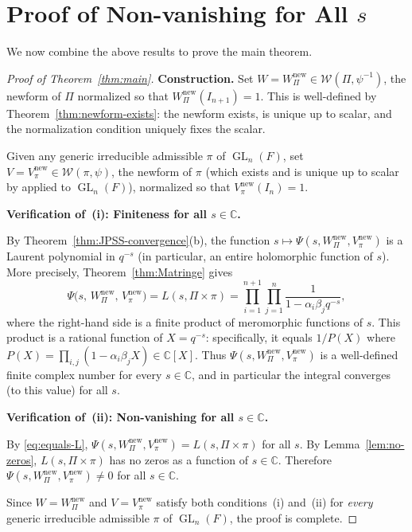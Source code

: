 \documentclass[12pt]{article}
\theoremstyle{definition}
\DeclareMathOperator{\GL}{GL}
\begin{document}
\section{Proof of Non-vanishing for All $s$}
\label{sec:nonvanishing}

We now combine the above results to prove the main theorem.

\begin{proof}[Proof of Theorem~\ref{thm:main}]

\textbf{Construction.}  Set $W = W_\Pi^{\mathrm{new}} \in \mathcal{W}(\Pi,\psi^{-1})$,
the newform of $\Pi$ normalized so that $W_\Pi^{\mathrm{new}}(I_{n+1}) = 1$.
This is well-defined by Theorem~\ref{thm:newform-exists}: the newform exists,
is unique up to scalar, and the normalization condition uniquely fixes the scalar.

Given any generic irreducible admissible $\pi$ of $\GL_n(F)$, set $V =
V_\pi^{\mathrm{new}} \in \mathcal{W}(\pi,\psi)$, the newform of $\pi$ (which
exists and is unique up to scalar by \cite[Theorems~(1),(2)]{JPSS81} applied to
$\GL_n(F)$), normalized so that $V_\pi^{\mathrm{new}}(I_n) = 1$.

\medskip
\textbf{Verification of~(i): Finiteness for all $s \in \mathbb{C}$.}

By Theorem~\ref{thm:JPSS-convergence}(b), the function
$s \mapsto \Psi(s, W_\Pi^{\mathrm{new}}, V_\pi^{\mathrm{new}})$ is a Laurent
polynomial in $q^{-s}$ (in particular, an entire holomorphic function of $s$).
More precisely, Theorem~\ref{thm:Matringe} gives
\begin{equation}
  \label{eq:equals-L}
  \Psi\!\bigl(s,\, W_\Pi^{\mathrm{new}},\, V_\pi^{\mathrm{new}}\bigr)
  = L(s,\Pi\times\pi)
  = \prod_{i=1}^{n+1}\prod_{j=1}^{n} \frac{1}{1 - \alpha_i\beta_j q^{-s}},
\end{equation}
where the right-hand side is a finite product of meromorphic functions of $s$.
This product is a rational function of $X = q^{-s}$: specifically, it equals
$1/P(X)$ where $P(X) = \prod_{i,j}(1 - \alpha_i\beta_j X) \in \mathbb{C}[X]$.
Thus $\Psi(s, W_\Pi^{\mathrm{new}}, V_\pi^{\mathrm{new}})$ is a well-defined
finite complex number for every $s \in \mathbb{C}$, and in particular the
integral converges (to this value) for all $s$.

\medskip
\textbf{Verification of~(ii): Non-vanishing for all $s \in \mathbb{C}$.}

By \eqref{eq:equals-L},
$\Psi(s, W_\Pi^{\mathrm{new}}, V_\pi^{\mathrm{new}}) = L(s,\Pi\times\pi)$
for all $s$.  By Lemma~\ref{lem:no-zeros}, $L(s,\Pi\times\pi)$ has no zeros as
a function of $s \in \mathbb{C}$.  Therefore
$\Psi(s, W_\Pi^{\mathrm{new}}, V_\pi^{\mathrm{new}}) \neq 0$ for all
$s \in \mathbb{C}$.

\medskip

Since $W = W_\Pi^{\mathrm{new}}$ and $V = V_\pi^{\mathrm{new}}$ satisfy both
conditions~(i) and~(ii) for \emph{every} generic irreducible admissible $\pi$
of $\GL_n(F)$, the proof is complete.
\end{proof}
\end{document}
